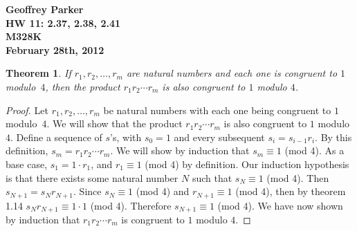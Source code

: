 \documentclass[12pt,leqno]{article}
\numberwithin{equation}{section}
\newtheorem{thm}{Theorem}[section]
\theoremstyle{definition}
\begin{document}
\thispagestyle{plain}
\begin{flushright}
\large{\textbf{Geoffrey Parker \\
HW 11: 2.37, 2.38, 2.41\\
M328K \\
February 28th, 2012 \\}}
\end{flushright}

\markboth{}{} \setcounter{section}{0} \baselineskip=18pt

\setcounter{tocdepth}{4}



\setcounter{section}{2}

\setcounter{thm}{36}


\begin{thm}
If $r_1, r_2, \hdots, r_m$ are natural numbers and each one is
congruent to $1$ modulo~$4$, then the product $r_1r_2 \cdots r_m$ is
also congruent to $1$ modulo $4$.
\end{thm}

\begin{proof}[Proof]
Let $r_1, r_2, \hdots, r_m$ be natural numbers with each one being congruent to $1$ modulo~$4$. We will show that the product $r_1r_2 \cdots r_m$ is also congruent to $1$ modulo $4$.  Define a sequence of $s$'s, with $s_0 = 1$ and every subsequent $s_i = s_{i-1}r_i$. By this definition, $s_m = r_1r_2 \cdots r_m$.  We will show by induction that $s_m \equiv 1$ (mod 4).  As a base case, $s_1 = 1\cdot r_1$, and $r_1 \equiv 1$ (mod 4) by definition.  Our induction hypothesis is that there exists some natural number $N$ such that $s_N \equiv 1$ (mod 4).  Then $s_{N+1} = s_Nr_{N+1}$.  Since $s_N \equiv 1$ (mod 4) and $r_{N+1} \equiv 1$ (mod 4), then by theorem 1.14 $s_Nr_{N+1} \equiv 1\cdot 1$ (mod 4).  Therefore $s_{N+1} \equiv 1$ (mod 4).  We have now shown by induction that $r_1r_2 \cdots r_m$ is congruent to $1$ modulo $4$.
\end{proof}


\end{document}
